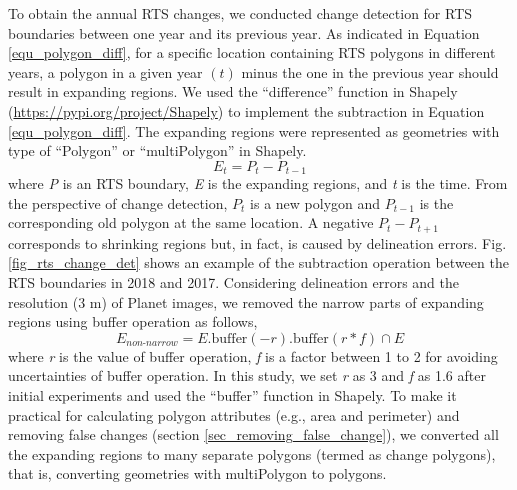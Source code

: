 \documentclass[authoryear,preprint,review,12pt]{elsarticle}
\begin{document}
To obtain the annual RTS changes, we conducted change detection for RTS boundaries between one year and its previous year.%
 As indicated in Equation \ref{equ_polygon_diff}, for a specific location containing RTS polygons in different years, a polygon in a given year $(t)$ minus the one in the previous year should result in expanding regions. 
We used the ``difference'' function in Shapely (\url{https://pypi.org/project/Shapely}) to implement the subtraction in Equation \ref{equ_polygon_diff}. 
The expanding regions were represented as geometries with type of ``Polygon'' or ``multiPolygon'' in Shapely.
\begin{equation}
E_{t}= P_{t} - P_{t-1}
\label{equ_polygon_diff}
\end{equation}
where \emph{P} is an RTS boundary, \emph{E} is the expanding regions, and \emph{t} is the time. 
From the perspective of change detection, $P_{t}$ is a new polygon and $P_{t-1}$ is the corresponding old polygon at the same location. 
A negative $P_{t} - P_{t+1}$ corresponds to shrinking regions but, in fact, is caused by delineation errors. 
Fig. \ref{fig_rts_change_det} shows an example of the subtraction operation between the RTS boundaries in 2018 and 2017. 
Considering delineation errors and the resolution (3 m) of Planet images, we removed the narrow parts of expanding regions using buffer operation as follows, 
\begin{equation}
E_{non\text{-}narrow}= E.\text{buffer}(-r).\text{buffer}(r*f) \cap E
\label{equ_polygon_buffer}
\end{equation}
where \emph{r} is the value of buffer operation,  \emph{f} is a factor between 1 to 2 for avoiding uncertainties of buffer operation. 
In this study, we set \emph{r} as 3 and \emph{f} as 1.6 after initial experiments and used the ``buffer'' function in Shapely.
To make it practical for calculating polygon attributes (e.g., area and perimeter) and removing false changes (section \ref{sec_removing_false_change}), we converted all the expanding regions to many separate polygons (termed as change polygons), that is, converting geometries with multiPolygon to polygons.



\end{document}
